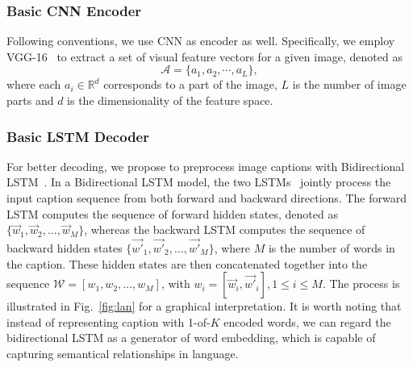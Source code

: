 \documentclass[10pt,twocolumn,letterpaper]{article}
\begin{document}
	\subsubsection{Basic CNN Encoder}
	Following conventions, we use CNN as encoder as well. Specifically, we employ VGG-16~\cite{simonyan2014very} to extract a set of visual feature vectors for a given image, denoted as
	\begin{equation}
	\mathcal{A}  = \{ {a _1},{a _2}, \cdots ,{a _L}\},
	\end{equation}
	where each ${a_i} \in {\mathbb{R}^d}$ corresponds to a part of the image, $L$ is the number of image parts and $d$ is the dimensionality of the feature space.
	
	\subsubsection{Basic LSTM Decoder}
	
	
	For better decoding, we propose to preprocess image captions with Bidirectional LSTM~\cite{}. In a Bidirectional LSTM model, the two LSTMs~\cite{hochreiter1997long} jointly process the input caption sequence from both forward and backward directions. The forward LSTM computes the sequence of forward hidden states, denoted as $\{\vec{w}_1,\vec{w}_2,...,\vec{w}_M\}$, whereas the backward LSTM computes the sequence of backward hidden states $\{\vec{w'}_1,\vec{w'}_2,...,\vec{w'}_M\}$, where $M$ is the number of words in the caption. These hidden states are then concatenated together into the sequence $\mathcal{W} = [w_ 1, w_2,...,w_M ]$, with $w_i = [\vec{w}_i, \vec{w'}_i], 1 \leq i \leq M$. The process is illustrated in Fig.~\ref{fig:lan} for a graphical interpretation. It is worth noting that instead of representing caption with 1-of-$K$ encoded words, we can regard the bidirectional LSTM as a generator of word embedding, which is capable of capturing semantical relationships in language.
	
\end{document}
